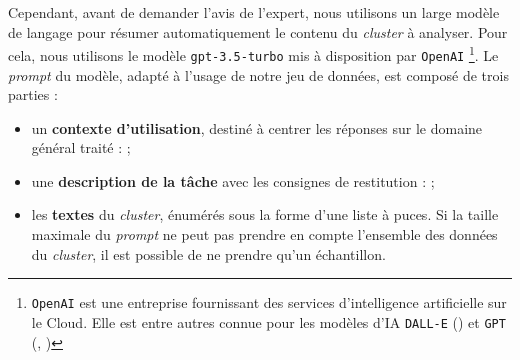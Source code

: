 			Cependant, avant de demander l'avis de l'expert, nous utilisons un large modèle de langage pour résumer automatiquement le contenu du \textit{cluster} à analyser.
			Pour cela, nous utilisons le modèle \texttt{gpt-3.5-turbo} mis à disposition par \texttt{OpenAI} \footnote{
				\texttt{OpenAI} est une entreprise fournissant des services d'intelligence artificielle sur le Cloud.
				Elle est entre autres connue pour les modèles d'IA \texttt{DALL-E} (\cite{ramesh-etal:2021:zeroshot-texttoimage-generation}) et \texttt{GPT} (\cite{brown-etal:2020:language-models-are}, \cite{openai:2023:chatgpt})
			}.
			Le \textit{prompt} du modèle, adapté à l'usage de notre jeu de données, est composé de trois parties :
			\begin{itemize}
				\item un \textbf{contexte d'utilisation}, destiné à centrer les réponses sur le domaine général traité :  ;
				\item une \textbf{description de la tâche} avec les consignes de restitution :  ;
				\item les \textbf{textes} du \textit{cluster}, énumérés sous la forme d'une liste à puces. Si la taille maximale du \textit{prompt} ne peut pas prendre en compte l'ensemble des données du \textit{cluster}, il est possible de ne prendre qu'un échantillon.
			\end{itemize}
			
			
